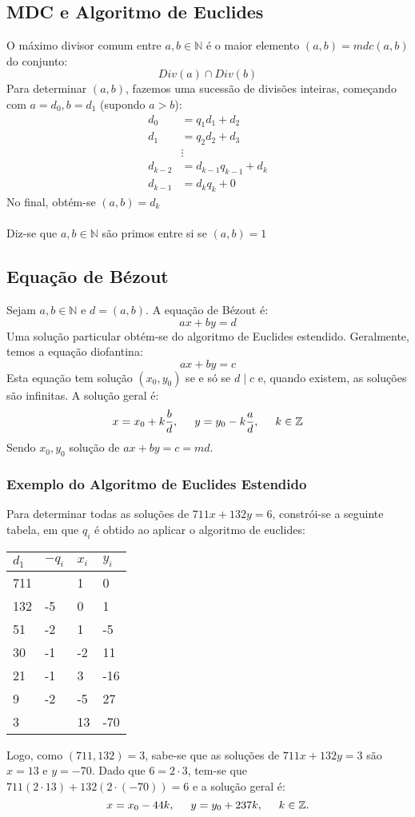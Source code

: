 \documentclass[10pt,a4paper]{report}
\begin{document}
\subsection{MDC e Algoritmo de Euclides}
O máximo divisor comum entre $a, b \in \mathbb{N}$ é o maior elemento $(a,b) = mdc(a,b)$ do conjunto:
$$
Div(a) \cap Div(b)
$$
Para determinar $(a,b)$, fazemos uma sucessão de divisões inteiras, começando com $a = d_0, b = d_1$ (supondo $a > b$):
\begin{align}
d_0 &= q_1d_1 + d_2\\
d_1 &= q_2d_2 + d_3\\
&\vdots\\
d_{k-2} &= d_{k-1}q_{k-1} + d_k\\
d_{k-1} &= d_kq_k + 0
\end{align}
No final, obtém-se $(a,b) = d_k$\\
\\
Diz-se que $a,b \in \mathbb{N}$ são primos entre si se $(a,b) = 1$
\subsection{Equação de Bézout}
Sejam $a, b \in \mathbb{N}$ e $d = (a, b)$. A equação de Bézout é:
$$
ax + by = d
$$
Uma solução particular obtém-se do algoritmo de Euclides estendido. Geralmente, temos a equação diofantina:
$$
ax + by = c
$$
Esta equação tem solução $(x_0, y_0)$ se e só se $d \mid c$ e, quando existem, as soluções são infinitas. A solução geral é:
$$
x = x_0 + k\frac{b}{d}, \hspace{0.5cm} y = y_0 - k\frac{a}{d}, \hspace{0.5cm} k \in \mathbb{Z}
$$
Sendo $x_0, y_0$ solução de $ax + by = c = md$.
\subsubsection{Exemplo do Algoritmo de Euclides Estendido}
Para determinar todas as soluções de $711x + 132y = 6$, constrói-se a seguinte tabela, em que $q_i$ é obtido ao aplicar o algoritmo de euclides:
\begin{table}[H]
\centering
\begin{tabular}{llll}
 $d_1$&$-q_i$& $x_i$& $y_i$ \\ \hline
711 &    & 1  & 0   \\
132 & -5 & 0  & 1   \\
51  & -2 & 1  & -5  \\
30  & -1 & -2 & 11  \\
21  & -1 & 3  & -16 \\
9   & -2 & -5 & 27  \\
3   &    & 13 & -70
\end{tabular}
\end{table}
Logo, como $(711,132) = 3$, sabe-se que as soluções de $711x + 132y = 3$ são $x = 13$ e $y = -70$. Dado que $6 = 2 \cdot 3$, tem-se que $711(2\cdot 13) + 132(2 \cdot (-70)) = 6$ e a solução geral é:
$$
x = x_0 - 44k, \hspace{0.5cm} y = y_0 + 237k, \hspace{0.5cm} k \in \mathbb{Z}.
$$
\end{document}
